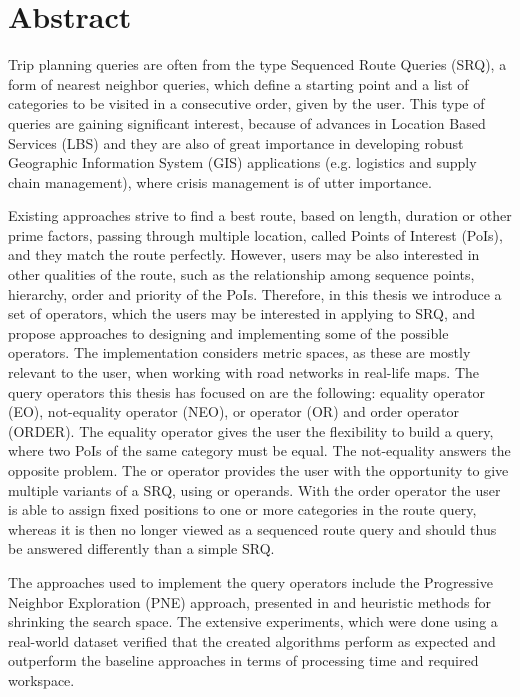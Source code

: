 \chapter{Abstract}
\enlargethispage*{30pt}

Trip planning queries are often from the type Sequenced Route Queries (SRQ), a form of nearest neighbor queries, which define a starting point and a list of categories to be visited in a consecutive order, given by the user. This type of queries are gaining significant interest, because of advances in Location Based Services (LBS) and they are also of great importance in developing robust Geographic Information System (GIS) applications (e.g. logistics and supply chain management), where crisis management is of utter importance. 

Existing approaches strive to find a best route, based on length, duration or other prime factors, passing through multiple location, called Points of Interest (PoIs), and they match the route perfectly. However, users may be also interested in other qualities of the route, such as the relationship among sequence points, hierarchy, order and priority of the PoIs. Therefore, in this thesis we introduce a set of operators, which the users may be interested in applying to SRQ, and propose approaches to designing and implementing some of the possible operators. The implementation considers metric spaces, as these are mostly relevant to the user, when working with road networks in real-life maps.
The query operators this thesis has focused on are the following: equality operator (EO), not-equality operator (NEO), or operator (OR) and order operator (ORDER). The equality operator gives the user the flexibility to build a query, where two PoIs of the same category must be equal. The not-equality answers the opposite problem. The or operator provides the user with the opportunity to give multiple variants of a SRQ, using or operands. With the order operator the user is able to assign fixed positions to one or more categories in the route query, whereas it is then no longer viewed as a sequenced route query and should thus be answered differently than a simple SRQ.

The approaches used to implement the query operators include the Progressive Neighbor Exploration (PNE) approach, presented in \cite{OSR} and heuristic methods for shrinking the search space. The extensive experiments, which were done using a real-world dataset verified that the created algorithms perform as expected and outperform the baseline approaches in terms of processing time and required workspace.

\pagebreak